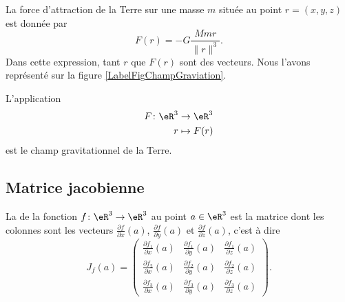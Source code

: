 \begin{example}
    La force d'attraction de la Terre sur une masse $m$ située au point $r=(x,y,z)$ est donnée par
    \begin{equation}
        F(r)=-G\frac{ Mmr }{ \| r \|^3 }.
    \end{equation}
    Dans cette expression, tant $r$ que $F(r)$ sont des vecteurs. Nous l'avons représenté sur la figure \ref{LabelFigChampGraviation}.
    \newcommand{\CaptionFigChampGraviation}{Le champ de gravitation de la Terre.}
    

    L'application
    \begin{equation}
        \begin{aligned}
            F\colon \eR^3&\to \eR^3 \\
            r&\mapsto F(r) 
        \end{aligned}
    \end{equation}
    est le champ gravitationnel de la Terre.
\end{example}

\subsection{Matrice jacobienne}

La  de la fonction $f\colon \eR^3\to \eR^3$ au point $a\in\eR^3$ est la matrice dont les colonnes sont les vecteurs $\frac{ \partial f }{ \partial x }(a)$, $\frac{ \partial f }{ \partial y }(a)$ et $\frac{ \partial f }{ \partial z }(a)$, c'est à dire
\begin{equation}
    J_f(a)=\begin{pmatrix}
        \frac{ \partial f_1 }{ \partial x }(a)   &   \frac{ \partial f_1 }{ \partial y }(a)    &   \frac{ \partial f_1 }{ \partial z }(a)    \\
        \frac{ \partial f_2 }{ \partial x }(a)   &   \frac{ \partial f_2 }{ \partial y }(a)    &   \frac{ \partial f_2 }{ \partial z }(a)    \\
        \frac{ \partial f_3 }{ \partial x }(a)   &   \frac{ \partial f_3 }{ \partial y }(a)    &   \frac{ \partial f_3 }{ \partial z }(a)    
    \end{pmatrix}.
\end{equation}

